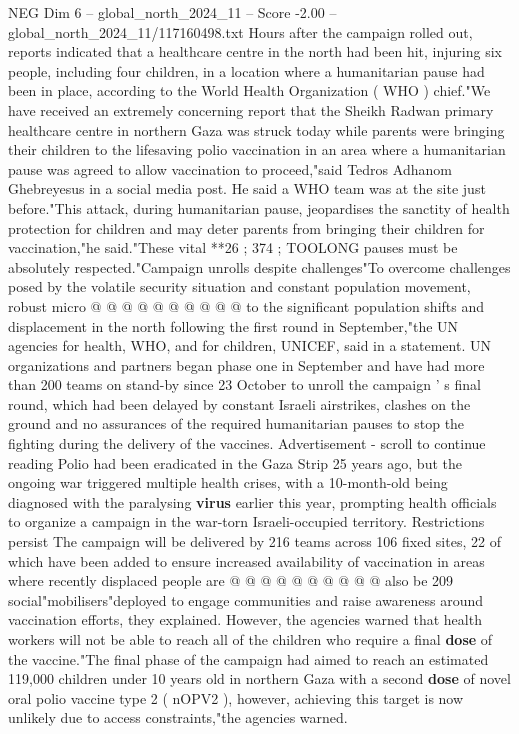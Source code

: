 \begin{textsample}{NEG Dim 6 – global\_north\_2024\_11 – Score -2.00 – global\_north\_2024\_11/117160498.txt}  \label{ex:f6_neg_156}
Hours after the campaign rolled out, reports indicated that a healthcare centre in the north had been hit, injuring six people, including four children, in a location where a humanitarian pause had been in place, according to the World Health Organization ( WHO ) chief."We have received an extremely concerning report that the Sheikh Radwan primary healthcare centre in northern Gaza was struck today while parents were bringing their children to the lifesaving polio vaccination in an area where a humanitarian pause was agreed to allow vaccination to proceed,"said Tedros Adhanom Ghebreyesus in a social media post.
He said a WHO team was at the site just before."This attack, during humanitarian pause, jeopardises the sanctity of health protection for children and may deter parents from bringing their children for vaccination,"he said."These vital **26 ; 374 ; TOOLONG pauses must be absolutely respected."Campaign unrolls despite challenges"To overcome challenges posed by the volatile security situation and constant population movement, robust micro @ @ @ @ @ @ @ @ @ @ to the significant population shifts and displacement in the north following the first round in September,"the UN agencies for health, WHO, and for children, UNICEF, said in a statement.
UN organizations and partners began phase one in September and have had more than 200 teams on stand-by since 23 October to unroll the campaign ' s final round, which had been delayed by constant Israeli airstrikes, clashes on the ground and no assurances of the required humanitarian pauses to stop the fighting during the delivery of the vaccines.
Advertisement - scroll to continue reading Polio had been eradicated in the Gaza Strip 25 years ago, but the ongoing war triggered multiple health crises, with a 10-month-old being diagnosed with the paralysing \textbf{virus} earlier this year, prompting health officials to organize a campaign in the war-torn Israeli-occupied territory.
Restrictions persist The campaign will be delivered by 216 teams across 106 fixed sites, 22 of which have been added to ensure increased availability of vaccination in areas where recently displaced people are @ @ @ @ @ @ @ @ @ @ also be 209 social"mobilisers"deployed to engage communities and raise awareness around vaccination efforts, they explained.
However, the agencies warned that health workers will not be able to reach all of the children who require a final \textbf{dose} of the vaccine."The final phase of the campaign had aimed to reach an estimated 119,000 children under 10 years old in northern Gaza with a second \textbf{dose} of novel oral polio vaccine type 2 ( nOPV2 ), however, achieving this target is now unlikely due to access constraints,"the agencies warned.

\end{textsample}
